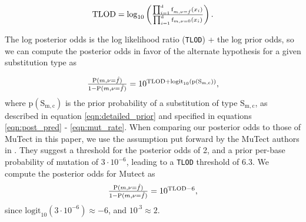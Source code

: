 \documentclass[a4,center,fleqn]{NAR}
\begin{document}
\begin{equation}
  \label{eqn:tlod}
    $$
    \mathrm{TLOD} = \mathrm{log}_{10}\left(\frac{\prod_{i=1}^{\mathrm{d}} \textrm{f}_{m,\nu = \hat{f}}(x_i)}{\prod_{i=1}^{\mathrm{d}} \textrm{f}_{m,\nu = 0}(x_i)}\right).
    $$
\end{equation}

The log posterior odds is the log likelihood ratio (\texttt{TLOD}) + the log prior odds, so we can compute the posterior odds in favor of the alternate hypothesis for a given substitution type as

\begin{equation}
  \label{eqn:computed_posterior}
  $$
  \frac{\mathrm{P}(m,\nu = \hat{f})}{1 - \mathrm{P}(m,\nu = \hat{f})} = 10^{\mathrm{TLOD} + \mathrm{logit}_{10}(\mathrm{p}(\mathrm{S_{m,c}}))},
  $$
\end{equation}
where $\mathrm{p}(\mathrm{S_{m,c}})$ is the prior probability of a substitution of type $\mathrm{S_{m,c}}$, as described in equation \ref{eqn:detailed_prior} and specified in equations \ref{eqn:post_pred} - \ref{eqn:mut_rate}.
When comparing our posterior odds to those of MuTect in this paper, we use the assumption put forward by the MuTect authors in \citet{Cibulskis2013}.
They suggest a threshold for the posterior odds of 2, and a prior per-base probability of mutation of $3\cdot10^{-6}$, leading to a \texttt{TLOD} threshold of 6.3.
We compute the posterior odds for Mutect as
\begin{equation}
  \label{eqn:mutect_posterior}
  $$
  \frac{\mathrm{P}(m,\nu = \hat{f})}{1 - \mathrm{P}(m,\nu = \hat{f})} = 10^{\mathrm{TLOD} - 6},
  $$
\end{equation}
since $\mathrm{logit}_{10}(3\cdot10^{-6}) \approx -6$, and $10^{.3} \approx 2$.
\end{document}
